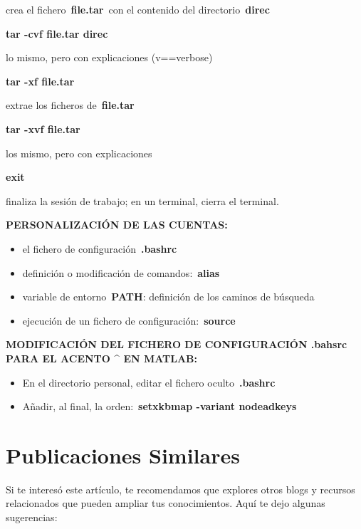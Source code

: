 \documentclass[
  jou,
  floatsintext,
  longtable,
  a4paper,
  nolmodern,
  notxfonts,
  notimes,
  colorlinks=true,linkcolor=blue,citecolor=blue,urlcolor=blue]{apa7}
\providecommand{\tightlist}{%
  \setlength{\itemsep}{0pt}\setlength{\parskip}{0pt}}
\begin{document}
crea el fichero~\textbf{file.tar}~con el contenido del
directorio~\textbf{direc}

\textbf{tar -cvf file.tar direc}

lo mismo, pero con explicaciones (v==verbose)

\textbf{tar -xf file.tar}

extrae los ficheros de~\textbf{file.tar}

\textbf{tar -xvf file.tar}

los mismo, pero con explicaciones

\textbf{exit}

finaliza la sesión de trabajo; en un terminal, cierra el terminal.

\textbf{PERSONALIZACIÓN DE LAS CUENTAS:}

\begin{itemize}
\tightlist
\item
  el fichero de configuración~\textbf{.bashrc}
\item
  definición o modificación de comandos:~\textbf{alias}
\item
  variable de entorno~\textbf{PATH}: definición de los caminos de
  búsqueda
\item
  ejecución de un fichero de configuración:~\textbf{source}
\end{itemize}

\textbf{MODIFICACIÓN DEL FICHERO DE CONFIGURACIÓN .bahsrc PARA EL ACENTO
\^{} EN MATLAB:}

\begin{itemize}
\tightlist
\item
  En el directorio personal, editar el fichero oculto~\textbf{.bashrc}
\item
  Añadir, al final, la orden:~\textbf{setxkbmap -variant nodeadkeys}
\end{itemize}

\section{Publicaciones Similares}\label{publicaciones-similares}

Si te interesó este artículo, te recomendamos que explores otros blogs y
recursos relacionados que pueden ampliar tus conocimientos. Aquí te dejo
algunas sugerencias:
\end{document}
